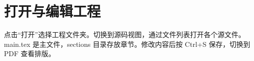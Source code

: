 \section{打开与编辑工程}
点击“打开”选择工程文件夹。切换到源码视图，通过文件列表打开各个源文件。
main.tex 是主文件，sections 目录存放章节。修改内容后按 Ctrl+S 保存，切换到 PDF 查看排版。

